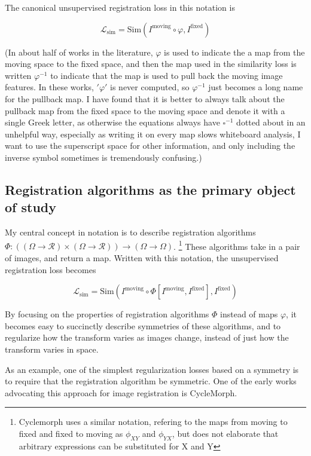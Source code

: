 \documentclass{article}
\begin{document}
The canonical unsupervised registration loss in this notation is 

$$ \mathcal{L}_\text{sim} = \text{Sim}(I^\text{moving} \circ  \varphi , I^\text{fixed}) $$

(In about half of works in the literature, $\varphi$ is used to indicate the a map from the moving space to the fixed space, and then the map used in the similarity loss is written $\varphi^{-1}$ to indicate that the map is used to pull back the moving image features. In these works, $'\varphi'$ is never computed, so $\varphi^{-1}$ just becomes a long name for the pullback map. I have found that it is better to always talk about the pullback map from the fixed space to the moving space and denote it with a single Greek letter, as otherwise the equations always have $\square^{-1}$ dotted about in an unhelpful way, especially as writing it on every map slows whiteboard analysis, I want to use the superscript space for other information, and only including the inverse symbol sometimes is tremendously confusing.)
\subsection{Registration algorithms as the primary object of study}

My central concept in notation is to describe registration algorithms $\Phi: \left( (\Omega \rightarrow \mathcal{R}) \times (\Omega \rightarrow \mathcal{R}) \right)  \rightarrow (\Omega \rightarrow \Omega) $.
\footnote{Cyclemorph \cite{cyclemorph} uses a similar notation, refering to the maps from moving to fixed and fixed to moving as $\phi_{XY}$ and $\phi_{YX}$, but does not elaborate that arbitrary expressions can be substituted for X and Y} These algorithms take in a pair of images, and return a map. Written with this notation, the unsupervised registration loss becomes

$$ \mathcal{L}_\text{sim} = \text{Sim}(I^\text{moving} \circ  \Phi[I^\text{moving}, I^\text{fixed}] , I^\text{fixed}) $$

By focusing on the properties of registration algorithms $\Phi$ instead of maps $\varphi$, it becomes easy to succinctly describe symmetries of these algorithms, and to regularize how the transform varies as images change, instead of just how the transform varies in space. 

As an example, one of the simplest regularization losses based on a symmetry is to require that the registration algorithm be symmetric. One of the early works advocating this approach for image registration is CycleMorph.
\end{document}
